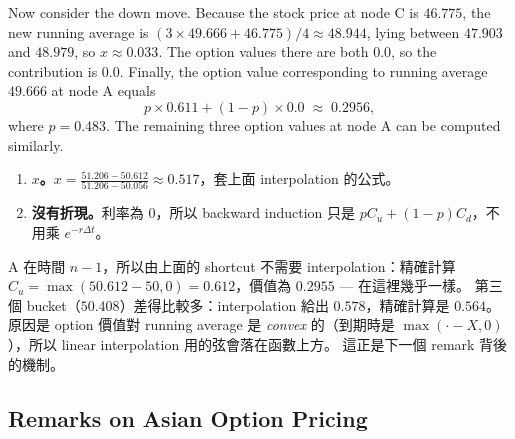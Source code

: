 Now consider the down move.
Because the stock price at node C is $46.775$, the new running average is $(3\times49.666+46.775)/4\approx48.944$, lying between $47.903$ and $48.979$, so $x\approx0.033$.
The option values there are both $0.0$, so the contribution is $0.0$.
Finally, the option value corresponding to running average $49.666$ at node A equals
\[
	p\times0.611+(1-p)\times0.0 \;\approx\; 0.2956 ,
\]
where $p=0.483$.
The remaining three option values at node A can be computed similarly.

\suppstart
{}

\begin{remark}
	\begin{enumerate}[(1),nosep]
		\item \textbf{$x$。}$x=\frac{51.206-50.612}{51.206-50.056}\approx0.517$，套上面 interpolation 的公式。
		\item \textbf{沒有折現。}利率為 $0$，所以 backward induction 只是 $pC_{u}+(1-p)C_{d}$，不用乘 $e^{-r\Delta t}$。
	\end{enumerate}
\end{remark}

\begin{note}
	A 在時間 $n-1$，所以由上面的 shortcut 不需要 interpolation：精確計算 $C_{u}=\max(50.612-50,0)=0.612$，價值為 $0.2955$ --- 在這裡幾乎一樣。
	第三個 bucket（$50.408$）差得比較多：interpolation 給出 $0.578$，精確計算是 $0.564$。
	原因是 option 價值對 running average 是 \emph{convex} 的（到期時是 $\max(\cdot-X,0)$），所以 linear interpolation 用的弦會落在函數上方。
	這正是下一個 remark 背後的機制。
\end{note}
\suppend

\subsection{Remarks on Asian Option Pricing}



